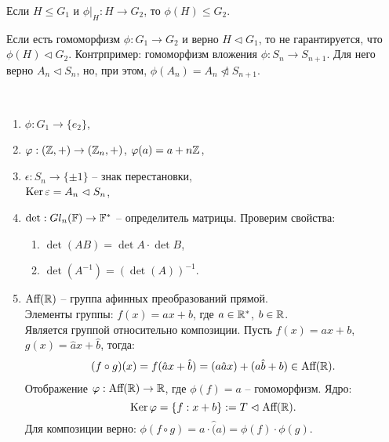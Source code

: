 \begin{note}
    Если $H \leq G_1$ и $\phi \vert_{H}: H \to G_2$, то $\phi(H) \leq G_2$.
\end{note}

\begin{note}
    Если есть гомоморфизм $\phi: G_1 \to G_2$ и верно $H \vartriangleleft  G_1$, то 
    не гарантируется, что $\phi(H) \vartriangleleft G_2$. Контрпример: гомоморфизм вложения $\phi: 
    S_n \to S_{n+1}$. Для него верно $A_n \vartriangleleft S_n$, 
    но, при этом, $\phi(A_n) = A_n \ntriangleleft S_{n+1}$.
\end{note}

\begin{example}~
    \label{ex2.1}
    \begin{enumerate}
        \item $\phi: G_1 \to \{e_2\}$,
        \item $\varphi: (\mathbb{Z}, +) \to (\mathbb{Z}_n, +)$, $\varphi(a) = a + n\mathbb{Z}$,
        \item $\epsilon: S_n \to \{\pm 1\}$ -- знак перестановки,\\
        $\operatorname{Ker} \varepsilon = A_n \vartriangleleft S_n$,
        \item $\det: Gl_n(\mathbb{F}) \to \mathbb{F}^*$ -- определитель матрицы. Проверим свойства:
        \begin{enumerate}
            \item $\det(AB) = \det A \cdot \det B$, 
            \item $\det(A^{-1}) = (\det(A))^{-1}$.
        \end{enumerate}
        \item $\text{Aff}(\mathbb{R})$ -- группа афинных преобразований прямой. \\
        Элементы группы: $f(x) = ax + b$, где $a \in \mathbb{R}^*$, $b \in \mathbb{R}$. \\
        Является 
        группой относительно композиции. Пусть $f(x) = ax + b$, $g(x) = \hat{a}x + \hat{b}$, тогда:
        \begin{gather*}
            (f \circ g)(x) = f(\hat{a}x + \hat{b}) = (a\hat{a}x) + (a\hat{b}+b) \in \text{Aff}(\mathbb{R}).
        \end{gather*}
        Отображение $\varphi: \text{Aff}(\mathbb{R}) \to \mathbb{R}$, где $\phi(f) = a$ -- гомоморфизм. Ядро:
        $$\operatorname{Ker} \varphi = \{f: x + b\} := T \vartriangleleft \text{Aff}(\mathbb{R}).$$ 
        Для композиции верно: $\phi(f \circ g) = a \cdot \hat(a) = \phi(f) \cdot \phi(g)$.\\
    \end{enumerate}
\end{example}


